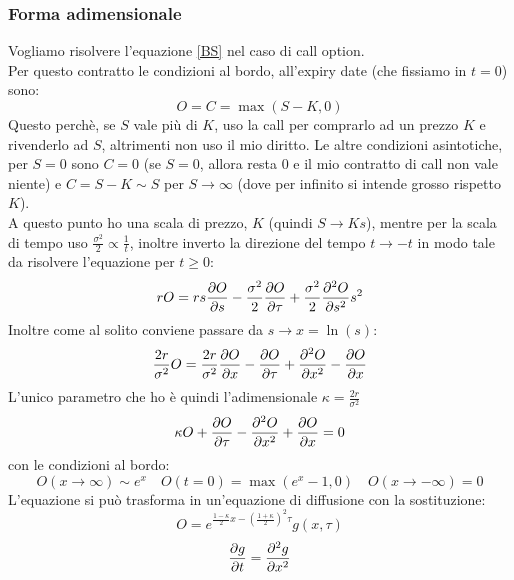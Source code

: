 \documentclass[a4paper,12pt]{article}
\theoremstyle{plain}
\theoremstyle{definition}
\newcommand{\f}[2]{\frac{#1}{#2}}
\theoremstyle{remark}
\begin{document}
\subsubsection{Forma adimensionale}
Vogliamo risolvere l'equazione \ref{BS} nel caso di call option.\\Per questo contratto le condizioni al bordo, all'expiry date (che fissiamo in $t=0$) sono:
\[O=C=\max\left(S-K,0\right)			\]
Questo perchè, se $S$ vale più di $K$, uso la call per comprarlo ad un prezzo $K$ e rivenderlo ad $S$, altrimenti non uso il mio diritto.
Le altre condizioni asintotiche, per $S=0$ sono $C=0$ (se $S=0$, allora resta $0$ e il mio contratto di call non vale niente) e $C=S-K\sim S$ per $S\rightarrow\infty$ (dove per infinito si intende grosso rispetto $K$).\\
A questo punto ho una scala di prezzo, $K$ (quindi $S\rightarrow K s$), mentre per la scala di tempo uso $\f{\sigma^2}{2}\propto \f{1}{t}$, inoltre inverto la direzione del tempo $t\rightarrow-t$ in modo tale da risolvere l'equazione per $t\ge0$:
\[rO=rs\pdv{O}{s}-\f{\sigma^2}{2}\pdv{O}{\tau}+\f{\sigma^2}{2}\pdv[2]{O}{s} s^2 \]
Inoltre come al solito conviene passare da $s\rightarrow x=\ln(s)$:
\[\f{2r}{\sigma^2}O=\f{2r}{\sigma^2}\pdv{O}{x}		-\pdv{O}{\tau}+\pdv[2]{O}{x} -\pdv{O}{x} 	\]
L'unico parametro che ho è quindi l'adimensionale $\kappa=\f{2r}{\sigma^2}$
\[\kappa O+\pdv{O}{\tau}-\pdv[2]{O}{x}+\pdv{O}{x}	(1-\kappa)	=0\]
con le condizioni al bordo:
\[O(x\rightarrow\infty)\sim e^x		\quad O(t=0)=\max\left(e^x-1,0\right)\quad O(x\rightarrow-\infty)=0\]
L'equazione si può trasforma in un'equazione di diffusione con la sostituzione:
\[O=e^{\f{1-\kappa}{2}x-\left(\f{1+\kappa}{2}\right)^2	\tau			}g(x,\tau)\]
\[\pdv{g}{t}=\pdv[2]{g}{x}\]
\end{document}
